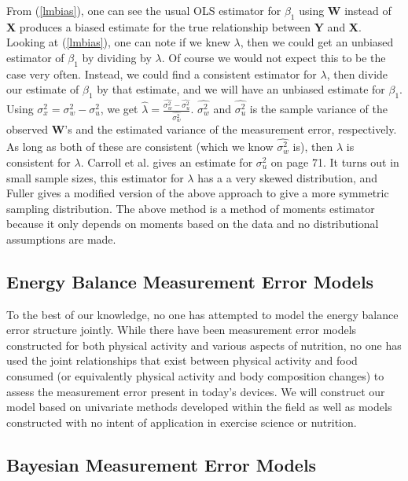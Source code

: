 \documentclass[11pt]{article}\usepackage[]{graphicx}\usepackage[]{color}
\begin{document}
From (\ref{lmbias}), one can see the usual OLS estimator for $\beta_1$ using {\bf W} instead of {\bf X} produces a biased estimate for the true relationship between {\bf Y} and {\bf X}. Looking at (\ref{lmbias}), one can note if we knew $\lambda$, then we could get an unbiased estimator of $\beta_1$ by dividing by $\lambda$. Of course we would not expect this to be the case very often. Instead, we could find a consistent estimator for $\lambda$, then divide our estimate of $\beta_1$ by that estimate, and we will have an unbiased estimate for $\beta_1$. Using $\sigma_x^2 = \sigma_w^2 - \sigma_u^2$, we get $\hat{\lambda} = \frac{\hat{\sigma_w^2} - \hat{\sigma_u^2}}{\hat{\sigma_w^2}}$. $\hat{\sigma_w^2}$ and $\hat{\sigma_u^2}$ is the sample variance of the observed {\bf W}'s and the estimated variance of the measurement error, respectively. As long as both of these are consistent (which we know $\hat{\sigma_w^2}$ is), then $\hat{\lambda}$ is consistent for $\lambda$. Carroll et al. gives an estimate for $\sigma_u^2$ on page 71. It turns out in small sample sizes, this estimator for $\lambda$ has a a very skewed distribution, and Fuller \cite{linear} gives a modified version of the above approach to give a more symmetric sampling distribution. The above method is a method of moments estimator because it only depends on moments based on the data and no distributional assumptions are made. 


\subsection{Energy Balance Measurement Error Models}

To the best of our knowledge, no one has attempted to model the energy balance error structure jointly. While there have been measurement error models constructed for both physical activity and various aspects of nutrition, no one has used the joint relationships that exist between physical activity and food consumed (or equivalently physical activity and body composition changes) to assess the measurement error present in today's devices. We will construct our model based on univariate methods developed within the field as well as models constructed with no intent of application in exercise science or nutrition. 


\subsection{Bayesian Measurement Error Models}
\end{document}
